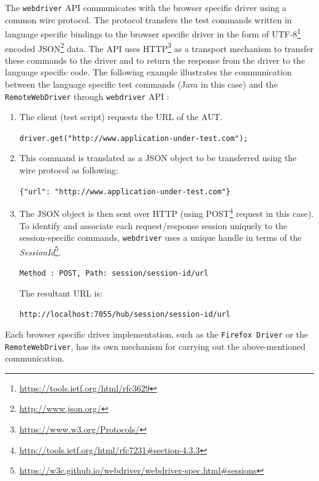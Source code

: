 The \texttt{webdriver} API communicates with the browser specific driver using a common wire protocol. The protocol transfers the test commands written in language specific bindings to the browser specific driver in the form of UTF-8\footnote{\url{https://tools.ietf.org/html/rfc3629}} encoded JSON\footnote{\url{http://www.json.org/}} data. The API uses HTTP\footnote{\url{https://www.w3.org/Protocols/}} as a transport mechanism to transfer these commands to the driver and to return the response from the driver to the language specific code. 
\noindent 
The following example illustrates the communication between the language specific test commands (Java in this case) and the \texttt{RemoteWebDriver} through \texttt{webdriver} API :
\begin{enumerate}
\item The client (test script) requests the URL of the AUT.\\
\begin{small}
\texttt{driver.get("http://www.application-under-test.com");}
\end{small}
\item This command is translated as a JSON object to be transferred using the wire protocol as following:\\
\begin{small}
\texttt{\{"url": "http://www.application-under-test.com"\}}
\end{small}
\item The JSON object is then sent over HTTP (using POST\footnote{\url{http://tools.ietf.org/html/rfc7231\#section-4.3.3}} request in this case). To identify and associate each request/response session uniquely to the session-specific commands, \texttt{webdriver} uses a unique handle in terms of the \textit{SessionId}\footnote{\url{https://w3c.github.io/webdriver/webdriver-spec.html\#sessions}}.\\
\begin{small}
\texttt{Method : POST, Path: session/{session-id}/url}\\
\end{small}
The resultant URL is:\\
\begin{small}
\texttt{http://localhost:7055/hub/session/{session-id}/url}
\end{small}
\end{enumerate}

Each browser specific driver implementation, such as the \texttt{Firefox Driver} or the \texttt{RemoteWebDriver}, has its own mechanism for carrying out the above-mentioned communication. 

